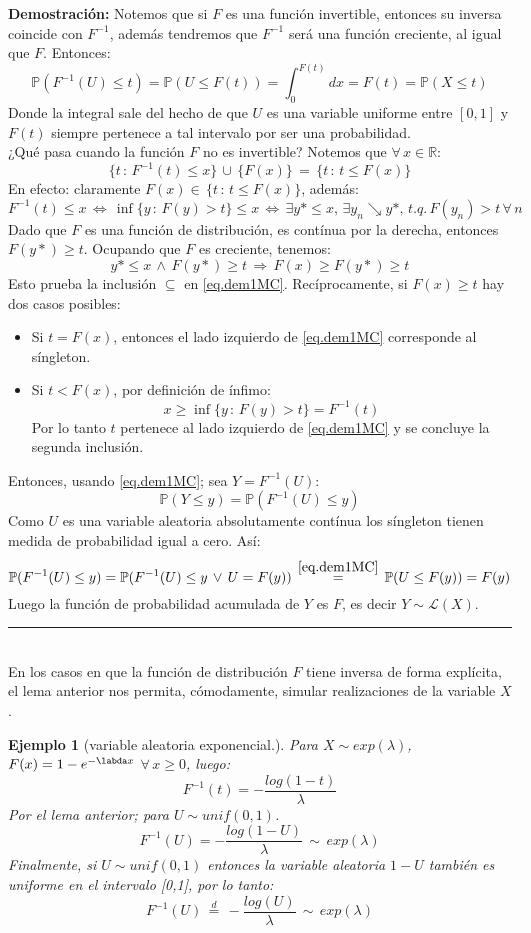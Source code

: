 \documentclass[a4paper]{article}
\newtheorem{ejemplo}{Ejemplo}
\numberwithin{equation}{subsection}
\def\R{\mathbb R}
\newcommand{\pb}{\mathbb{P}}
\begin{document}
\textbf{Demostración: }Notemos que si $F$ es una función invertible, entonces su inversa coincide con $F^{-1}$, además tendremos que $F^{-1}$ será una función creciente, al igual que $F$. Entonces:
\[\pb(F^{-1}(U)\leq t) = \pb(U\leq F(t)) = \int_{0}^{F(t)}dx = F(t) = \pb(X\leq t)\]
Donde la integral sale del hecho de que $U$ es una variable uniforme entre $[0,1]$ y $F(t)$ siempre pertenece a tal intervalo por ser una probabilidad.\\ \newline
¿Qué pasa cuando la función $F$ no es invertible? Notemos que $\forall\,x\in\R$:
\begin{equation}
    \{t\,:\,F^{-1}(t)\leq x\}\,\cup\,\{F(x)\}\,=\,\{t\,:\,t\leq F(x)\}
    \label{eq.dem1MC}
\end{equation}
En efecto: claramente $F(x)\in\,\{t\,:\,t\leq F(x)\}$, además:
\[F^{-1}(t)\leq x\,\Longleftrightarrow\,\inf\{y\,:\,F(y)>t\}\leq x\,\Longleftrightarrow\,\exists y*\leq x,\,\exists y_n\searrow y*,\,t.q.\,F(y_n)>t\,\forall\,n\]
Dado que $F$ es una función de distribución, es contínua por la derecha, entonces $F(y*)\geq t$. Ocupando que $F$ es creciente, tenemos:
\[y*\leq x\,\wedge\,F(y*)\geq t\,\Rightarrow\,F(x)\geq F(y*)\geq t\]
Esto prueba la inclusión $\subseteq$ en \ref{eq.dem1MC}. Recíprocamente, si $F(x)\geq t$ hay dos casos posibles:
\begin{itemize}
    \item Si $t=F(x)$, entonces el lado izquierdo de \ref{eq.dem1MC} corresponde al síngleton.
    \item Si $t<F(x)$, por definición de ínfimo:
    \[x\geq \inf\{y\,:\,F(y)>t\} = F^{-1}(t)\]
    Por lo tanto $t$ pertenece al lado izquierdo de \ref{eq.dem1MC} y se concluye la segunda inclusión.
\end{itemize}
Entonces, usando \ref{eq.dem1MC}; sea $Y=F^{-1}(U)$:
\[\pb(Y\leq y) = \pb(F^{-1}(U)\leq y)\]
Como $U$ es una variable aleatoria absolutamente contínua los síngleton tienen medida de probabilidad igual a cero. Así:
\[\pb(F^{-1}(U)\leq y) = \pb(F^{-1}(U)\leq y\,\vee\,U=F(y))\, \overset{\ref{eq.dem1MC}}{=}\,\pb(U\leq F(y)) = F(y)\]
Luego la función de probabilidad acumulada de $Y$ es $F$, es decir $Y\sim \mathcal{L}(X)$. \rule{0.7em}{0.7em}\\ \newline
En los casos en que la función de distribución $F$ tiene inversa de forma explícita, el lema anterior nos permita, cómodamente, simular realizaciones de la variable $X$.

\begin{ejemplo}[variable aleatoria exponencial.] Para $X\sim exp(\lambda)$, $F(x)=1-e^{-\labda x}$ $\forall\,x\geq 0$, luego:
\[F^{-1}(t) = -\frac{log(1-t)}{\lambda}\]
Por el lema anterior; para $U\sim unif(0,1)$.
\[F^{-1}(U) = -\frac{log(1-U)}{\lambda}\,\sim\,exp(\lambda)\]
Finalmente, si $U\sim unif(0,1)$ entonces la variable aleatoria $1-U$ también es uniforme en el intervalo [0,1], por lo tanto:
\[F^{-1}(U)\,\overset{d}{=}\,-\frac{log(U)}{\lambda}\,\sim\,exp(\lambda)\]
\end{ejemplo}
\end{document}
